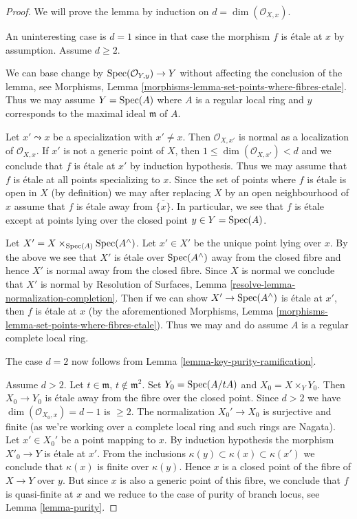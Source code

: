 \begin{proof}
We will prove the lemma by induction on $d = \dim(\mathcal{O}_{X, x})$.

\medskip\noindent
An uninteresting case is $d = 1$ since in that case the morphism
$f$ is \'etale at $x$ by assumption. Assume $d \geq 2$.

\medskip\noindent
We can base change by $\mathop{\mathrm{Spec}}(\mathcal{O}_{Y, y}) \to Y$
without affecting the conclusion of the lemma, see
Morphisms, Lemma \ref{morphisms-lemma-set-points-where-fibres-etale}.
Thus we may assume $Y = \mathop{\mathrm{Spec}}(A)$ where $A$ is a regular local
ring and $y$ corresponds to the maximal ideal $\mathfrak m$ of $A$.

\medskip\noindent
Let $x' \leadsto x$ be a specialization with $x' \not = x$.
Then $\mathcal{O}_{X, x'}$ is normal as a localization of
$\mathcal{O}_{X, x}$. If $x'$ is not a generic point of $X$,
then $1 \leq \dim(\mathcal{O}_{X, x'}) < d$ and we conclude that
$f$ is \'etale at $x'$ by induction hypothesis.
Thus we may assume that $f$ is \'etale at all points specializing to
$x$. Since the set of points where $f$ is \'etale is open in $X$
(by definition) we may after replacing $X$ by an open neighbourhood of $x$
assume that $f$ is \'etale away from $\overline{\{x\}}$.
In particular, we see that $f$ is \'etale except at points
lying over the closed point $y \in Y = \mathop{\mathrm{Spec}}(A)$.

\medskip\noindent
Let $X' = X \times_{\mathop{\mathrm{Spec}}(A)} \mathop{\mathrm{Spec}}(A^\wedge)$. Let $x' \in X'$
be the unique point lying over $x$. By the above we see that
$X'$ is \'etale over $\mathop{\mathrm{Spec}}(A^\wedge)$ away from the closed fibre and
hence $X'$ is normal away from the closed fibre. Since $X$ is normal
we conclude that $X'$ is normal by
Resolution of Surfaces, Lemma \ref{resolve-lemma-normalization-completion}.
Then if we can show $X' \to \mathop{\mathrm{Spec}}(A^\wedge)$ is \'etale at $x'$,
then $f$ is \'etale at $x$ (by the aforementioned
Morphisms, Lemma \ref{morphisms-lemma-set-points-where-fibres-etale}).
Thus we may and do assume $A$ is a regular complete local ring.

\medskip\noindent
The case $d = 2$ now follows from Lemma \ref{lemma-key-purity-ramification}.

\medskip\noindent
Assume $d > 2$. Let $t \in \mathfrak m$, $t \not \in \mathfrak m^2$.
Set $Y_0 = \mathop{\mathrm{Spec}}(A/tA)$ and $X_0 = X \times_Y Y_0$.
Then $X_0 \to Y_0$ is \'etale away from the fibre over the closed point.
Since $d > 2$ we have $\dim(\mathcal{O}_{X_0, x}) = d - 1$ is $\geq 2$.
The normalization $X_0' \to X_0$ is surjective and finite
(as we're working over a complete local ring and such rings are Nagata).
Let $x' \in X_0'$ be a point mapping to $x$. By induction hypothesis the
morphism $X'_0 \to Y$ is \'etale at $x'$. From the inclusions
$\kappa(y) \subset \kappa(x) \subset \kappa(x')$
we conclude that $\kappa(x)$ is finite over $\kappa(y)$.
Hence $x$ is a closed point of the fibre of $X \to Y$
over $y$. But since $x$ is also a generic point of
this fibre, we conclude that $f$ is quasi-finite at $x$
and we reduce to the case of purity of branch locus, see
Lemma \ref{lemma-purity}.
\end{proof}




